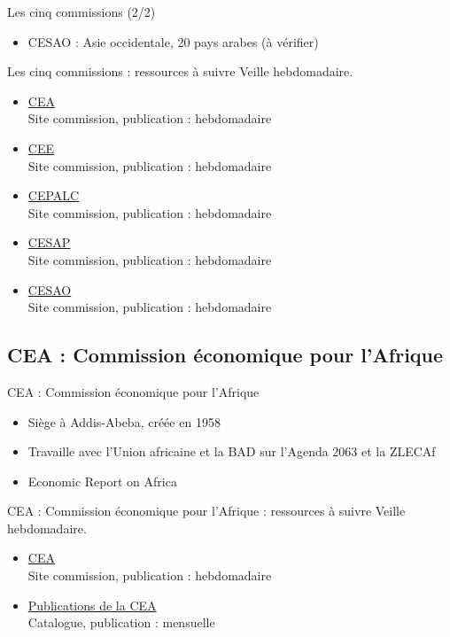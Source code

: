 \documentclass[aspectratio=169,11pt]{beamer}
\begin{document}
\begin{frame}{Les cinq commissions (2/2)}
\begin{itemize}
\item CESAO : Asie occidentale, 20 pays arabes (à vérifier)
\end{itemize}
\end{frame}

\begin{frame}{Les cinq commissions : ressources à suivre}
\small
Veille hebdomadaire.
\begin{itemize}
\item \href{https://www.uneca.org}{CEA}\\{\footnotesize Site commission, publication : hebdomadaire}
\item \href{https://unece.org}{CEE}\\{\footnotesize Site commission, publication : hebdomadaire}
\item \href{https://www.cepal.org}{CEPALC}\\{\footnotesize Site commission, publication : hebdomadaire}
\item \href{https://www.unescap.org}{CESAP}\\{\footnotesize Site commission, publication : hebdomadaire}
\item \href{https://www.unescwa.org}{CESAO}\\{\footnotesize Site commission, publication : hebdomadaire}
\end{itemize}
\end{frame}

\subsection{CEA : Commission économique pour l'Afrique}
\begin{frame}{CEA : Commission économique pour l'Afrique}
\begin{itemize}
\item Siège à Addis-Abeba, créée en 1958
\item Travaille avec l'Union africaine et la BAD sur l'Agenda 2063 et la ZLECAf
\item Economic Report on Africa
\end{itemize}
\end{frame}

\begin{frame}{CEA : Commission économique pour l'Afrique : ressources à suivre}
\small
Veille hebdomadaire.
\begin{itemize}
\item \href{https://www.uneca.org}{CEA}\\{\footnotesize Site commission, publication : hebdomadaire}
\item \href{https://www.uneca.org/publications}{Publications de la CEA}\\{\footnotesize Catalogue, publication : mensuelle}
\end{itemize}
\end{frame}
\end{document}
